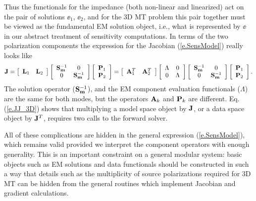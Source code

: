 Thus the functionals for the
impedance (both non-linear and linearized) act
on the pair of solutions $\ee_1$, $\ee_2$,
and for the 3D MT problem this pair together must
be viewed as the fundamental EM solution object,
i.e., what is represented by $\ee$ in our abstract
treatment of sensitivity computations.
In terms of the two polarization components
the expression for the Jacobian
(\ref{e.SensModel}) really looks like
\begin{equation}
\label{e.JJ_3D}
{\bf J} = \left [
\begin{array}{c c}
{\bf L}_1 & {\bf L}_2 
\end{array}
\right]
\left [
\begin{array}{c c}
{\bf S}_{\bf m}^{-1} & 0\\
0  &{\bf S}_{\bf m}^{-1} 
\end{array}
\right ]
\left [
\begin{array}{c}
{\bf P}_1 \\
{\bf P}_2 
\end{array}
\right ]  = 
\left [ 
\begin{array}{c c}
{\bf A}_1^T  & {\bf A}_2^T 
\end{array}
\right]
\left [
\begin{array}{c c}
\Lambda & 0\\
0  & \Lambda 
\end{array}
\right ]
\left [
\begin{array}{c c}
{\bf S}_{\bf m}^{-1} & 0\\
0  & {\bf S}_{\bf m}^{-1} 
\end{array}
\right ]
\left [
\begin{array}{c }
{\bf P}_1 \\
{\bf P}_2 
\end{array}
\right ] .
\end{equation}
The solution operator (${\bf S}_{\bf m}^{-1}$), 
and the EM component evaluation functionals ($\Lambda$)
are the same for both modes,
but the operators ${\bf A}_k$ and ${\bf P}_k$
are different.   Eq. (\ref{e.JJ_3D}) shows that multiplying
a model space object by ${\bf J}$, or
a data space object by ${\bf J}^T$,
requires two calls to the forward solver.

All of these complications
are hidden in the general expression 
(\ref{e.SensModel}), which remains valid provided we interpret
the component operators with enough generality.
This is an important constraint on a general
modular system: basic objects such as EM solutions
and data functionals should be constructed in such a way
that details such as the multiplicity of source polarizations
required for 3D MT can be hidden from
the general routines which implement 
Jacobian and gradient calculations.

